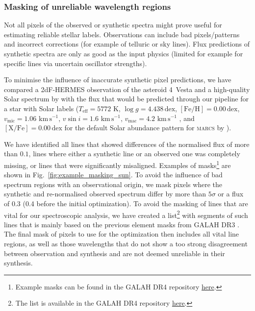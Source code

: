 \documentclass[
  journal=pasa,
  manuscript=research-paper, %
  year=2024,
  volume=37
]{cup-journal}
\newcommand{\marcs}{\textsc{marcs}\xspace}
\newcommand{\dex}{\,\mathrm{dex}}	%
\newcommand{\K}{\,\mathrm{K}}	%
\newcommand{\kms}{\,\mathrm{km\,s^{-1}}}	%
\begin{document}
\subsubsection{Masking of unreliable wavelength regions} \label{sec:masking_of_unreliable_wavelength_regions}

Not all pixels of the observed or synthetic spectra might prove useful for estimating reliable stellar labels. Observations can include bad pixels/patterns and incorrect corrections (for example of telluric or sky lines). Flux predictions of synthetic spectra are only as good as the input physics (limited for example for specific lines via uncertain oscillator strengths).

To minimise the influence of inaccurate synthetic pixel predictions, we have compared a 2dF-HERMES observation of the asteroid 4~Vesta and a high-quality Solar spectrum by \citet{Hinkle2000} with the flux that would be predicted through our pipeline for a star with Solar labels ($T_\text{eff} = 5772\,\K$, $\log g = 4.438\dex$, $\mathrm{[Fe/H]} = 0.00\dex$, $v_\text{mic} = 1.06\,\kms$, $v \sin i = 1.6\,\kms$, $v_\text{mac} = 4.2\,\kms$ \citep{Prsa2016, Jofre2017}, and $\mathrm{[X/Fe]} = 0.00\dex$ for the default Solar abundance pattern for \marcs by \citet{Grevesse2007}).

We have identified all lines that showed differences of the normalised flux of more than $0.1$, lines where either a synthetic line or an observed one was completely missing, or lines that were significantly misaligned. Examples of masks\footnote{Example masks can be found in the GALAH DR4 repository  \href{https://github.com/svenbuder/GALAH_DR4/blob/main/spectrum_analysis/spectrum_masks}{here}.} are shown in Fig.~\ref{fig:example_masking_sun}. To avoid the influence of bad spectrum regions with an observational origin, we mask pixels where the synthetic and re-normalised observed spectrum differ by more than $5\sigma$ or a flux of 0.3 (0.4 before the initial optimization). To avoid the masking of lines that are vital for our spectroscopic analysis, we have created a list\footnote{The list is available in the GALAH DR4 repository \href{https://github.com/svenbuder/GALAH_DR4/blob/main/spectrum_analysis/spectrum_masks/vital_lines.fits}{here}.}  with segments of such lines that is mainly based on the previous element masks from GALAH DR3 \citep{Buder2021}. The final mask of pixels to use for the optimization then includes all vital line regions, as well as those wavelengths that do not show a too strong disagreement between observation and synthesis and are not deemed unreliable in their synthesis.
\end{document}
